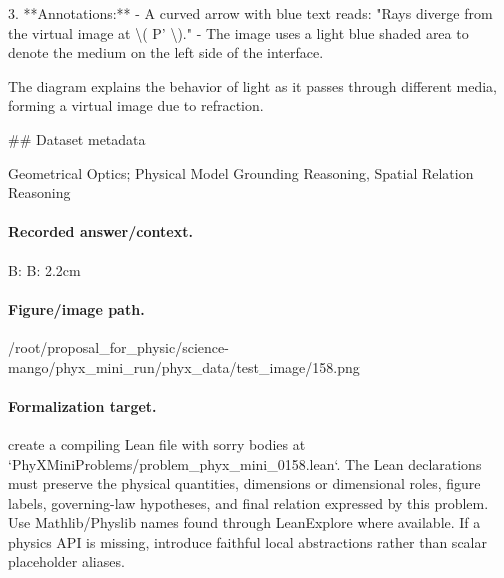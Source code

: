 3. **Annotations:**
   - A curved arrow with blue text reads: "Rays diverge from the virtual image at \textbackslash{}( P' \textbackslash{})."
   - The image uses a light blue shaded area to denote the medium on the left side of the interface.

The diagram explains the behavior of light as it passes through different media, forming a virtual image due to refraction.

\#\# Dataset metadata

Geometrical Optics; Physical Model Grounding Reasoning, Spatial Relation Reasoning

\paragraph{Recorded answer/context.}
B: B: 2.2cm

\paragraph{Figure/image path.}
/root/proposal\_for\_physic/science-mango/phyx\_mini\_run/phyx\_data/test\_image/158.png

\paragraph{Formalization target.}
create a compiling Lean file with sorry bodies at `PhyXMiniProblems/problem\_phyx\_mini\_0158.lean`. The Lean declarations must preserve the physical quantities, dimensions or dimensional roles, figure labels, governing-law hypotheses, and final relation expressed by this problem.
Use Mathlib/Physlib names found through LeanExplore where available. If a physics API is missing, introduce faithful local abstractions rather than scalar placeholder aliases.

